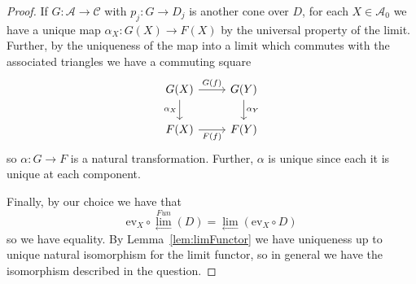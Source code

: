 \begin{proof}
    \vspace{10pt}

    If $G:\mathcal{A}\to \mathcal{C}$ with $p_j:G\to D_j$ is another cone over $D$, for each $X \in \mathcal{A}_0$ we have a unique map $\alpha_X:G(X)\to F(X)$ by the universal property of the limit. Further, by the uniqueness of the map into a limit which commutes with the associated triangles we have a commuting square
    \[\begin{tikzcd}
        {G(X)} & {G(Y)} \\
        {F(X)} & {F(Y)}
        \arrow["{G(f)}", from=1-1, to=1-2]
        \arrow["{\alpha_X}"', from=1-1, to=2-1]
        \arrow["{F(f)}"', from=2-1, to=2-2]
        \arrow["{\alpha_Y}", from=1-2, to=2-2]
    \end{tikzcd}\]
    so $\alpha:G\to F$ is a natural transformation. Further, $\alpha$ is unique since each it is unique at each component.

    \vspace{10pt}

    Finally, by our choice we have that 
    \begin{equation*}
        \text{ev}_X\circ \lim\limits_{\leftarrow}^{Fun}(D) = \lim\limits_{\leftarrow}(\text{ev}_X\circ D) 
    \end{equation*}
    so we have equality. By Lemma~\ref{lem:limFunctor} we have uniqueness up to unique natural isomorphism for the limit functor, so in general we have the isomorphism described in the question.
\end{proof}



